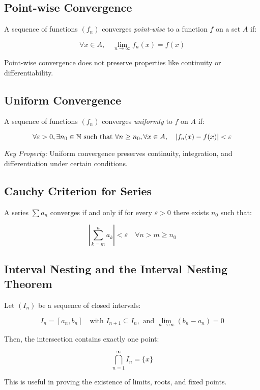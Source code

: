 \subsection{Point-wise Convergence}

A sequence of functions \((f_n)\) converges \emph{point-wise} to a function \(f\) on a set \(A\) if:

\[
    \forall x \in A, \quad \lim_{n \to \infty} f_n(x) = f(x)
\]

Point-wise convergence does not preserve properties like continuity or differentiability.

\subsection{Uniform Convergence}

A sequence of functions \((f_n)\) converges \emph{uniformly} to \(f\) on \(A\) if:

\[
    \forall \varepsilon > 0, \exists n_0 \in \mathbb{N} \text{ such that } \forall n \ge n_0, \forall x \in A, \quad |f_n(x) - f(x)| < \varepsilon
\]

\emph{Key Property:} Uniform convergence preserves continuity, integration, and differentiation under 
certain conditions.

\subsection{Cauchy Criterion for Series}

A series \(\sum a_n\) converges if and only if for every \(\varepsilon > 0\) there exists \(n_0\) 
such that:

\[
    \left| \sum_{k = m}^{n} a_k \right| < \varepsilon \quad \forall n > m \ge n_0
\]

\subsection{Interval Nesting and the Interval Nesting Theorem}

Let \((I_n)\) be a sequence of closed intervals:

\[
    I_n = [a_n, b_n] \quad \text{with } I_{n+1} \subseteq I_n, \text{ and } \lim_{n \to \infty} (b_n - a_n) = 0
\]

Then, the intersection contains exactly one point:

\[
    \bigcap_{n=1}^{\infty} I_n = \{x\}
\]

This is useful in proving the existence of limits, roots, and fixed points.

